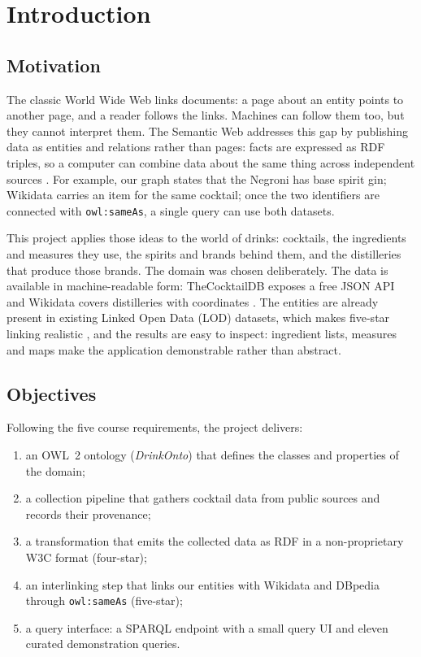\section{Introduction}
\label{sec:introduction}

\subsection{Motivation}

The classic World Wide Web links documents: a page about an entity
points to another page, and a reader follows the links. Machines can follow
them too, but they cannot interpret them. The Semantic Web addresses this gap
by publishing data as entities and relations rather than pages: facts
are expressed as RDF triples, so a computer can combine data about the same
thing across independent sources \cite{rdf11, fivestar}. For example, our graph
states that the Negroni has base spirit gin; Wikidata carries an item for the
same cocktail; once the two identifiers are connected with
\texttt{owl:sameAs}, a single query can use both datasets.

This project applies those ideas to the world of drinks: cocktails, the
ingredients and measures they use, the spirits and brands behind them, and the
distilleries that produce those brands. The domain was chosen deliberately. The
data is available in machine-readable form: TheCocktailDB exposes a free
JSON API \cite{cocktaildb} and Wikidata covers distilleries with coordinates
\cite{wikidata}. The entities are already present in existing Linked Open
Data (LOD) datasets, which makes five-star linking realistic \cite{dbpedia},
and the results are easy to inspect: ingredient lists, measures and maps make
the application demonstrable rather than abstract.

\subsection{Objectives}

Following the five course requirements, the project delivers:

\begin{enumerate}[label=(\arabic*), itemsep=2pt]
  \item an OWL~2 ontology (\emph{DrinkOnto}) that defines the classes and
        properties of the domain;
  \item a collection pipeline that gathers cocktail data from
        public sources and records their provenance;
  \item a transformation that emits the collected data as RDF in a
        non-proprietary W3C format (four-star);
  \item an interlinking step that links our entities with Wikidata and
        DBpedia through \texttt{owl:sameAs} (five-star);
  \item a query interface: a SPARQL endpoint with a small query UI and eleven
        curated demonstration queries.
\end{enumerate}

